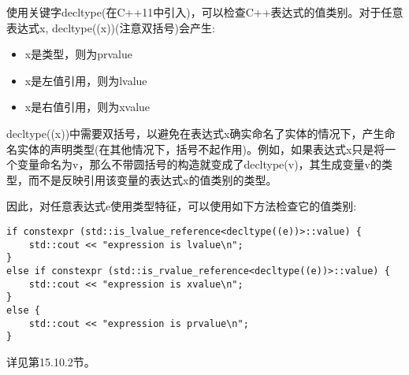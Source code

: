使用关键字decltype(在C++11中引入)，可以检查C++表达式的值类别。对于任意表达式x, decltype((x))(注意双括号)会产生:

\begin{itemize}
\item 
x是类型，则为prvalue

\item
x是左值引用，则为lvalue

\item
x是右值引用，则为xvalue
\end{itemize}

decltype((x))中需要双括号，以避免在表达式x确实命名了实体的情况下，产生命名实体的声明类型(在其他情况下，括号不起作用)。例如，如果表达式x只是将一个变量命名为v，那么不带圆括号的构造就变成了decltype(v)，其生成变量v的类型，而不是反映引用该变量的表达式x的值类别的类型。

因此，对任意表达式e使用类型特征，可以使用如下方法检查它的值类别:

\begin{lstlisting}[style=styleCXX]
if constexpr (std::is_lvalue_reference<decltype((e))>::value) {
	std::cout << "expression is lvalue\n";
}
else if constexpr (std::is_rvalue_reference<decltype((e))>::value) {
	std::cout << "expression is xvalue\n";
}
else {
	std::cout << "expression is prvalue\n";
}
\end{lstlisting}

详见第15.10.2节。







